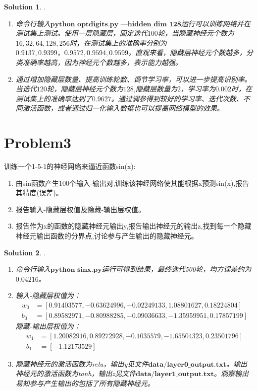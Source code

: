 \documentclass[a4paper,UTF8]{article}
\numberwithin{equation}{section}
\newtheorem*{solution}{Solution}
\begin{document}
\begin{solution}.
	\begin{enumerate}[(1)]
		\item 命令行输入$\textbf{python optdigits.py ---hidden\_dim 128}$运行可以训练网络并在测试集上测试。使用一层隐藏层，固定迭代$100$轮，当隐藏神经元个数为$16,32,64,128,256$时，在测试集上的准确率分别为$0.9137,0.9399，0.9572,0.9594,0.9599$。直观来看，隐藏层神经元个数越多，分类准确率越高，因为神经元个数越多，表示能力越强。
		\item 通过增加隐藏层数量、提高训练轮数、调节学习率，可以进一步提高识别率。当迭代$120$轮，隐藏层神经元个数为$128$,隐藏层数量为$2$，学习率为$0.002$时，在测试集上的准确率达到了$0.9627$。通过调参得到较好的学习率、迭代次数、不同激活函数，或者通过归一化输入数据也可以提高网络模型的效果。
	\end{enumerate}
\end{solution}
\section*{Problem3}
训练一个1-5-1的神经网络来逼近函数sin(x):
\begin{enumerate}[(1)]
	\item 由sin函数产生100个输入-输出对,训练该神经网络使其能根据x预测sin(x),报告其精度(误差)。
	\item 报告输入-隐藏层权值及隐藏-输出层权值。
	\item 报告作为x的函数的隐藏神经元输出y,报告输出神经元的输出z,找到每一个隐藏神经元输出函数的分界点,讨论参与产生输出的隐藏神经元。
\end{enumerate}
\begin{solution}.
\begin{enumerate}[(1)]
	\item 命令行输入$\textbf{python sinx.py}$运行可得到结果，最终迭代500轮，均方误差约为$0.04216$。
	\item 输入-隐藏层权值为：\begin{align*}
		w_0&=[0.91403577,-0.63624996,-0.02249133,1.08801627,0.18224804]\\
		b_0&=[0.89582971,-0.80988285,-0.09036633,-1.35959951,0.17857199]
	\end{align*}
    隐藏-输出层权值为：\begin{align*}
    	w_1&=[1.20082916,0.89272928,-0.1035579,-1.65504323,0.23501796]\\
    	b_1&=[-1.12173529]
    \end{align*}
    \item 隐藏神经元的激活函数为relu，输出y见文件$\textbf{data/layer0\_output.txt}$。输出神经元的激活函数为tanh，输出z见文件$\textbf{data/layer1\_output.txt}$。观察输出易知参与产生输出的包括了所有隐藏神经元。
\end{enumerate}
\end{solution}
\end{document}
